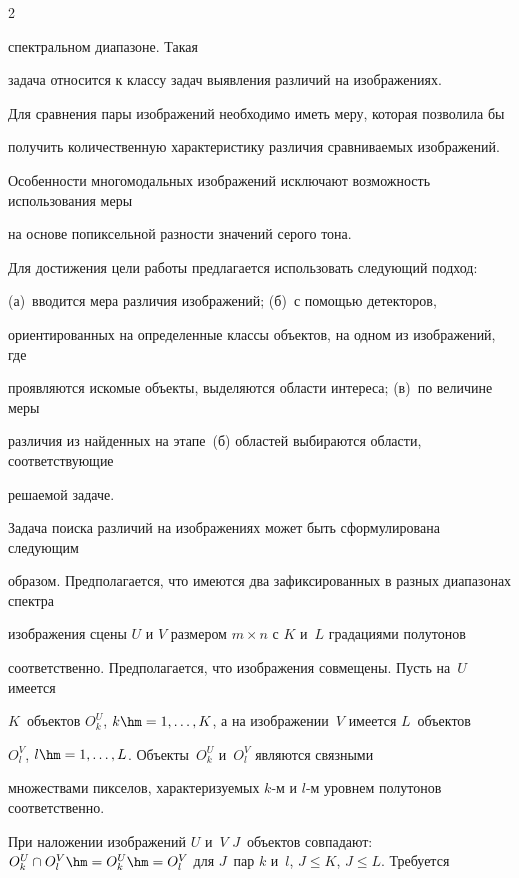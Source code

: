 \begin{multicols}{2}
\noindent


 спектральном диапазоне. Такая 


задача относится к классу задач выявления различий на изображениях.


  


  Для сравнения пары изображений необходимо иметь меру, которая позволила бы 


получить количественную характеристику различия сравниваемых изображений. 


Особенности многомодальных изоб\-ра\-же\-ний исключают возможность использования меры 


на основе попиксельной разности значений серого тона.


  


  Для достижения цели работы предлагается использовать следующий подход: 


(а)~вводится мера различия изображений; (б)~с помощью детекторов, 


ориентированных на определенные классы объектов, на одном из изображений, где 


проявляются искомые объекты, выделяются области интереса; (в)~по величине меры 


различия из найденных на этапе~(б) областей выбираются области, соответствующие 


решаемой задаче.


  


  Задача поиска различий на изображениях может быть сформулирована следующим 


образом. Предполагается, что имеются два зафиксированных в разных диапазонах спектра 


изображения сцены $U$ и $V$ размером $m\times n$ с $K$ и~$L$ градациями полутонов 


соответственно. Предполагается, что изображения совмещены. Пусть на~$U$ имеется 


$K$~объектов $O^U_k$,  $k \hm= 1, \ldots , K$, а на изображении~$V$ имеется $L$~объектов 


$O_l^V$, $l\hm = 1, \ldots , L$. Объекты~$O_k^U$ и~$O_l^V$ являются связными 


множествами пикселов, характеризуемых $k$-м и $l$-м уровнем полутонов соответственно. 


При наложении изображений $U$ и~$V$ $J$~объектов совпадают: $O_k^U\cap 


O_l^V\hm=O_k^U\hm =O_l^V$ для $J$~пар $k$ и~$l$, $J\leq K$, $J\leq L$. Требуется 



\end{multicols}
